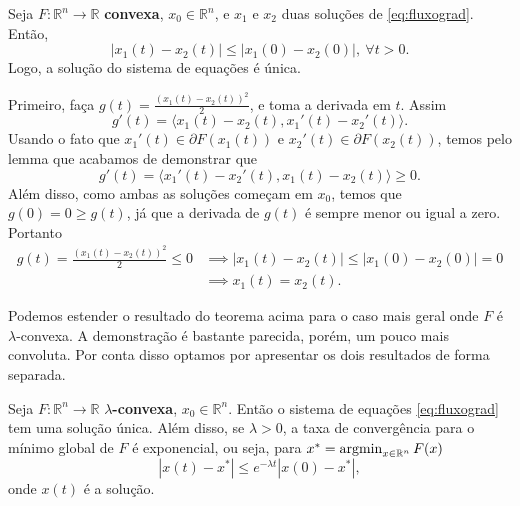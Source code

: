 \begin{theorem}
    Seja $F:\mathbb R^n \to \mathbb R$ \textbf{convexa}, $x_0 \in \mathbb R^n$, e
    $x_1$ e $x_2$ duas soluções de \eqref{eq:fluxograd}.
    Então,
    \begin{equation}
        |x_1(t) - x_2(t)| \leq |x_1(0) - x_2(0)|, \ \forall t >0.
    \end{equation}
    Logo, a solução do sistema de equações é única.
\end{theorem}
\begin{prf}
    Primeiro, faça $g(t) = \frac{(x_1(t) - x_2(t))^2}{2}$, e toma a derivada em $t$. Assim
    \begin{equation*}
        g'(t) = \langle x_1(t) - x_2(t), x_1'(t) - x_2'(t) \rangle.
    \end{equation*}
    Usando o fato que
    $x_1'(t) \in \partial F(x_1(t))$ e
    $x_2'(t) \in \partial F(x_2(t))$, temos pelo lemma que acabamos de demonstrar que
    \begin{equation*}
        g'(t) = \langle x_1'(t) - x_2'(t) , x_1(t) - x_2(t) \rangle \geq 0.
    \end{equation*}
    Além disso, como ambas as soluções começam em $x_0$, temos que $g(0) = 0 \geq g(t)$, já que
    a derivada de $g(t)$ é sempre menor ou igual a zero. Portanto
    \begin{align*}
        g(t) = \frac{(x_1(t) - x_2(t))^2}{2} \leq 0 &\implies
        |x_1(t) - x_2(t)| \leq |x_1(0) - x_2(0)| = 0 
        \\
        &\implies
        x_1(t) = x_2(t).
    \end{align*}
\end{prf}

Podemos estender o resultado do teorema acima para o caso mais geral onde
$F$ é $\lambda$-convexa. A demonstração é bastante parecida, porém, um pouco mais convoluta.
Por conta disso optamos por apresentar os dois resultados de forma separada.

\begin{theorem}
    Seja  $F:\mathbb R^n \to \mathbb R$ \textbf{$\lambda$-convexa}, $x_0 \in \mathbb R^n$.
    Então o sistema de equações \eqref{eq:fluxograd} tem uma solução única.
    Além disso, se $\lambda >0$, a taxa de convergência para o mínimo global
    de $F$ é exponencial, ou seja, para $x^* = \mathop{\rm argmin}_{x\in \mathbb R^n} F(x)$
    \begin{equation}
        |x(t) - x^*| \leq e^{-\lambda t}|x(0)- x^*|,
    \end{equation}
    onde $x(t)$ é a solução.
\end{theorem}